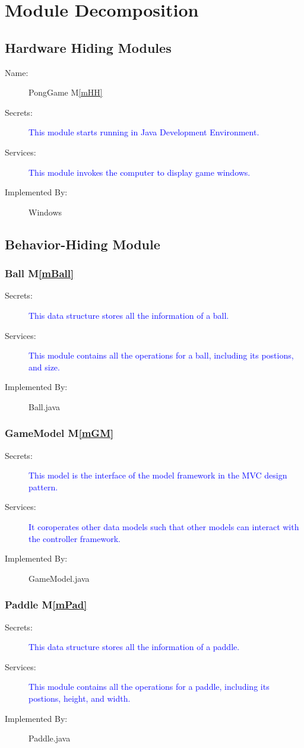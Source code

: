 \documentclass[12pt,letterpaper]{article}
\begin{document}
	\section{Module Decomposition} \label{SecMD}
	\subsection{Hardware Hiding Modules}
\begin{description}
	\item[Name: ] PongGame M\ref{mHH}
	\item[Secrets: ] \textcolor{blue}{This module starts running in Java Development Environment.}
	\item[Services: ] \textcolor{blue} {This module invokes the computer to display game windows.}
	\item[Implemented By: ] Windows
\end{description}
	\subsection{Behavior-Hiding Module}
	\subsubsection{Ball M\ref{mBall}}
\begin{description} 
	\item[Secrets: ] \textcolor{blue}{This data structure stores all the information of a ball.}
	\item[Services: ] \textcolor{blue} {This module contains all the operations for a ball, including its postions, and size.}
	\item[Implemented By: ] Ball.java
\end{description}
	\subsubsection{GameModel M\ref{mGM}}
\begin{description} 
	\item[Secrets: ] \textcolor{blue}{This model is the interface of the model framework in the MVC design pattern.}
	\item[Services: ] \textcolor{blue} {It coroperates other data models such that other models can interact with the controller framework.}
	\item[Implemented By: ] GameModel.java
\end{description}
	\subsubsection{Paddle M\ref{mPad}}
\begin{description} 
	\item[Secrets: ] \textcolor{blue}{This data structure stores all the information of a paddle.}
	\item[Services: ] \textcolor{blue} {This module contains all the operations for a paddle, including its postions, height, and width.}
	\item[Implemented By: ] Paddle.java
\end{description}
\end{document}
